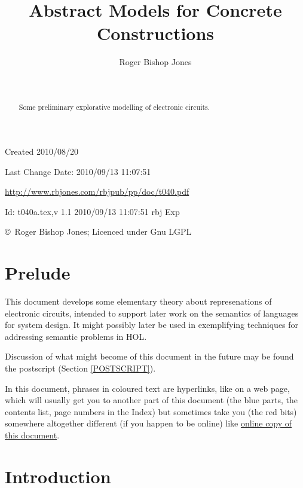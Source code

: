 \documentclass[11pt]{article}
\title{Abstract Models for Concrete Constructions}
\author{Roger Bishop Jones}
\date{\ }
\begin{document}
\begin{titlepage}
\maketitle
\begin{abstract}
Some preliminary explorative modelling of electronic circuits.
\end{abstract}
\vfill

\begin{centering}
{\footnotesize

Created 2010/08/20

Last Change $ $Date: 2010/09/13 11:07:51 $ $

\href{http://www.rbjones.com/rbjpub/pp/doc/t040.pdf}
{http://www.rbjones.com/rbjpub/pp/doc/t040.pdf}

$ $Id: t040a.tex,v 1.1 2010/09/13 11:07:51 rbj Exp $ $

\copyright\ Roger Bishop Jones; Licenced under Gnu LGPL

}%
\end{centering}

\thispagestyle{empty}
\end{titlepage}

\newpage
\addtocounter{page}{1}
{\parskip=0pt\tableofcontents}

\section{Prelude}

This document develops some elementary theory about represenations of electronic circuits, intended to support later work on the semantics of languages for system design.
It might possibly later be used in exemplifying techniques for addressing semantic problems in HOL.

Discussion of what might become of this document in the future may be found the postscript (Section \ref{POSTSCRIPT}).

In this document, phrases in coloured text are hyperlinks, like on a web page, which will usually get you to another part of this document (the blue parts, the contents list, page numbers in the Index) but sometimes take you (the red bits) somewhere altogether different (if you happen to be online) like \href{http://rbjones.com/rbjpub/pp/doc/t040.pdf}{online copy of this document}.

\cite{rbjt000}

\section{Introduction}
\end{document}
